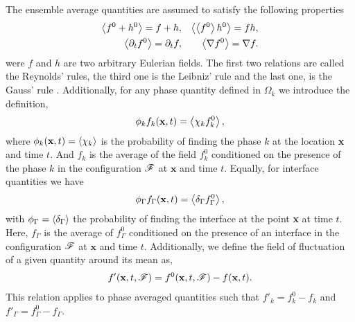 The ensemble average quantities are assumed to satisfy the following properties \citep{drew1983mathematical}
\begin{align}
    \avg{f^0+h^0} = f+h, 
    && \avg{\avg{f^0}h^0} = fh, \nonumber\\
    \avg{\pddt f^0} 
    = \pddt f,  
    &&\avg{\grad f^0}
    = \grad f. 
    \label{eq:avg_properties}
\end{align}
were $f$ and $h$ are two arbitrary Eulerian fields. 
The first two relations are called the Reynolds' rules, the third one is the Leibniz' rule and the last one, is the Gauss' rule \citep{drew1983mathematical}.
Additionally, for any phase quantity defined in $\Omega_k$ we introduce the definition, 
\begin{equation}
    \phi_k f_k (\textbf{x},t) = \avg{\chi_k f_k^0},
    \label{eq:1_avg}
\end{equation}
where $\phi_k(\textbf{x},t) = \left<\chi_k\right>$ is the probability of finding the phase $k$ at the location \textbf{x} and time $t$.
And $f_k$ is the average of the field $f_k^0$ conditioned on the presence of the phase $k$ in the configuration $\mathscr{F}$ at $\textbf{x}$ and time $t$.
Equally, for interface quantities we have 
\begin{equation}
    \phi_\Gamma f_\Gamma (\textbf{x},t) = \left<\delta_\Gamma f_\Gamma^0\right>,
\end{equation}
with $\phi_\Gamma = \left<\delta_\Gamma\right>$ the probability of finding the interface at the point \textbf{x} at time $t$. 
Here, $f_\Gamma$ is the average of $f^0_\Gamma$ conditioned on the presence of an interface in the configuration $\mathscr{F}$ at $\textbf{x}$ and time $t$. 
Additionally, we define the field of fluctuation of a given quantity around its mean as,
\begin{align}
    f'(\textbf{x},t,\FF) = f^0(\textbf{x},t,\FF) - f(\textbf{x},t).
    \label{eq:def_fluctu}
\end{align}
This relation applies to phase averaged quantities such that $f'_k = f^0_k - f_k$ and $f'_\Gamma = f^0_\Gamma - f_\Gamma$. 


